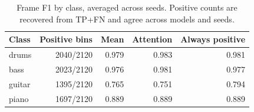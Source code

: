 \begin{table}[H]\centering\small
\caption{Frame F1 by class, averaged across seeds. Positive counts are recovered from TP+FN and agree across models and seeds.}\label{tab:classes}
\begin{tabular}{lrrrr}\toprule
Class & Positive bins & Mean & Attention & Always positive \\\midrule
drums & 2040/2120 & 0.979 & 0.983 & 0.981 \\
bass & 2023/2120 & 0.976 & 0.981 & 0.977 \\
guitar & 1395/2120 & 0.765 & 0.751 & 0.794 \\
piano & 1697/2120 & 0.889 & 0.889 & 0.889 \\
\bottomrule\end{tabular}\end{table}
